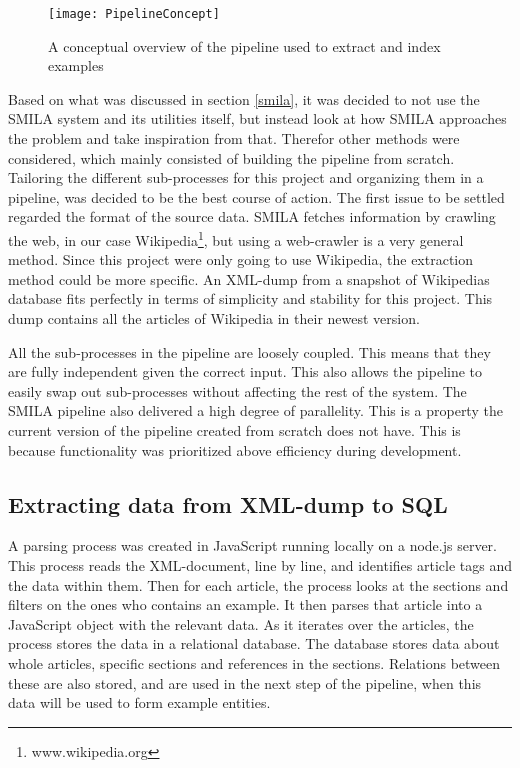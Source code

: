 
\begin{figure}[h]
\caption{A conceptual overview of the pipeline used to extract and index examples}
\texttt{[image: PipelineConcept]}
\end{figure}



Based on what was discussed in section \ref{smila}, it was decided to not use the SMILA system and its utilities itself, but instead look at how SMILA approaches the problem and take inspiration from that. Therefor other methods were considered, which mainly consisted of building the pipeline from scratch. Tailoring the different sub-processes for this project and organizing them in a pipeline, was decided to be the best course of action. The first issue to be settled regarded the format of the source data. SMILA fetches information by crawling the web, in our case Wikipedia\footnote{www.wikipedia.org}, but using a web-crawler is a very general method. Since this project were only going to use Wikipedia, the extraction method could be more specific. An XML-dump from a snapshot of Wikipedias database fits perfectly in terms of simplicity and stability for this project. This dump contains all the articles of Wikipedia in their newest version.


All the sub-processes in the pipeline are loosely coupled. This means that they are fully independent given the correct input. This also allows the pipeline to easily swap out sub-processes without affecting the rest of the system. The SMILA pipeline also delivered a high degree of parallelity. This is a property the current version of the pipeline created from scratch does not have. This is because functionality was prioritized above efficiency during development. 

\subsection{Extracting data from XML-dump to SQL}

A parsing process was created in JavaScript running locally on a node.js server. This process reads the XML-document, line by line, and identifies article tags and the data within them. Then for each article, the process looks at the sections and filters on the ones who contains an example. It then parses that article into a JavaScript object with the relevant data. As it iterates over the articles, the process stores the data in a relational database. The database stores data about whole articles, specific sections and references in the sections. Relations between these are also stored, and are used in the next step of the pipeline, when this data will be used to form example entities. 

